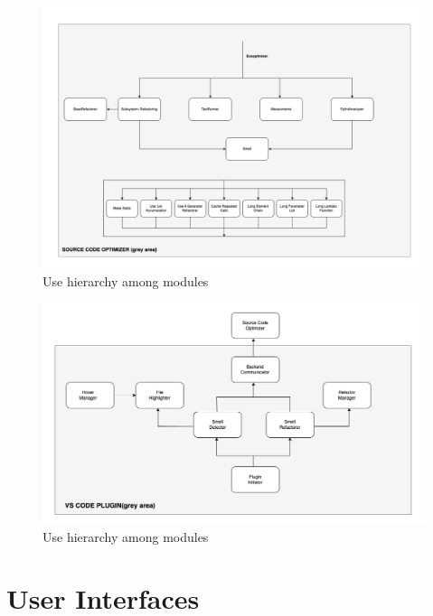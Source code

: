 \documentclass[12pt, titlepage]{article}
\begin{document}

\begin{figure}[H]
\centering
\includegraphics[width=\textwidth]{../../Images/sco_use_diagram.png}
\caption{Use hierarchy among modules}
\label{FigUH}
\end{figure}

\begin{figure}[H]
  \centering
  \includegraphics[width=\textwidth]{../../Images/plugin_use_diagram.png}
  \caption{Use hierarchy among modules}
  \label{FigUH_Plugin}
  \end{figure}


\section{User Interfaces}
\end{document}
